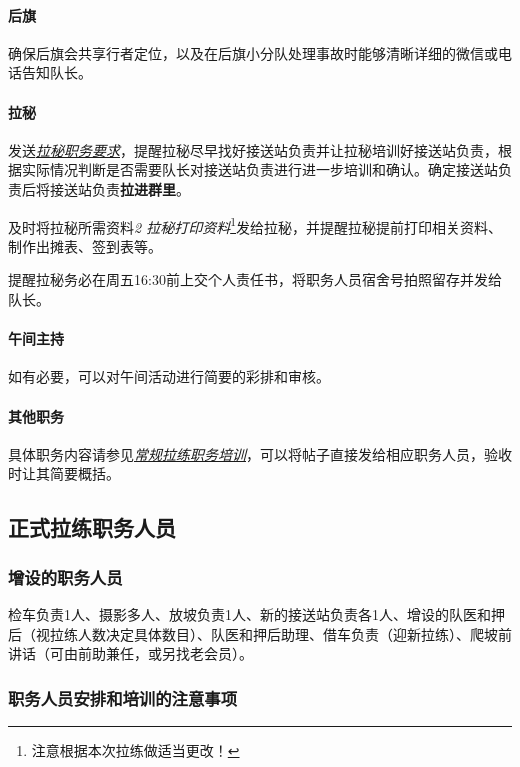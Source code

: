 \documentclass[UTF8]{ctexart}
\begin{document}
\paragraph{后旗}

确保后旗会共享行者定位，以及在后旗小分队处理事故时能够清晰详细的微信或电话告知队长。

\paragraph{拉秘}

发送\href{https://chexie.net/bbs/content/?bid=7&tid=1062&p=1#7}{\textit{拉秘职务要求}}，提醒拉秘尽早找好接送站负责并让拉秘培训好接送站负责，根据实际情况判断是否需要队长对接送站负责进行进一步培训和确认。确定接送站负责后将接送站负责\textbf{拉进群里}。

及时将拉秘所需资料{\color{blue}\textit{2 拉秘打印资料}}\footnote{注意根据本次拉练做适当更改！}发给拉秘，并提醒拉秘提前打印相关资料、制作出摊表、签到表等。

提醒拉秘务必在周五16:30前上交个人责任书，将职务人员宿舍号拍照留存并发给队长。

\paragraph{午间主持} 如有必要，可以对午间活动进行简要的彩排和审核。

\paragraph{其他职务}

具体职务内容请参见\href{https://chexie.net/bbs/content/?bid=7&tid=1062&p=1}{\textit{常规拉练职务培训}}，可以将帖子直接发给相应职务人员，验收时让其简要概括。

\subsection{正式拉练职务人员}

\subsubsection{增设的职务人员}

检车负责1人、摄影多人、放坡负责1人、新的接送站负责各1人、增设的队医和押后（视拉练人数决定具体数目）、队医和押后助理、借车负责（迎新拉练）、爬坡前讲话（可由前助兼任，或另找老会员）。

\subsubsection{职务人员安排和培训的注意事项}
\end{document}

